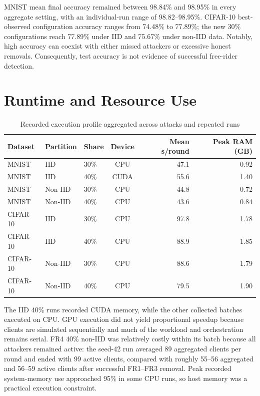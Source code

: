 MNIST mean final accuracy remained between 98.84\% and 98.95\% in every aggregate setting, with an individual-run range of 98.82--98.95\%. CIFAR-10 best-observed configuration accuracy ranges from 74.48\% to 77.89\%; the new 30\% configurations reach 77.89\% under IID and 75.67\% under non-IID data. Notably, high accuracy can coexist with either missed attackers or excessive honest removals. Consequently, test accuracy is not evidence of successful free-rider detection.

\section{Runtime and Resource Use}

\begin{table}[htbp]
\centering
\caption{Recorded execution profile aggregated across attacks and repeated runs}
\label{tab:resources}
\begin{tabular}{lllcrr}
\toprule
Dataset & Partition & Share & Device & Mean s/round & Peak RAM (GB) \\
\midrule
MNIST & IID & 30\% & CPU & 47.1 & 0.92 \\
MNIST & IID & 40\% & CUDA & 55.6 & 1.40 \\
MNIST & Non-IID & 30\% & CPU & 44.8 & 0.72 \\
MNIST & Non-IID & 40\% & CPU & 43.6 & 0.84 \\
CIFAR-10 & IID & 30\% & CPU & 97.8 & 1.78 \\
CIFAR-10 & IID & 40\% & CPU & 88.9 & 1.85 \\
CIFAR-10 & Non-IID & 30\% & CPU & 88.6 & 1.79 \\
CIFAR-10 & Non-IID & 40\% & CPU & 79.5 & 1.90 \\
\bottomrule
\end{tabular}
\end{table}

The IID 40\% runs recorded CUDA memory, while the other collected batches executed on CPU. GPU execution did not yield proportional speedup because clients are simulated sequentially and much of the workload and orchestration remains serial. FR4 40\% non-IID was relatively costly within its batch because all attackers remained active: the seed-42 run averaged 89 aggregated clients per round and ended with 99 active clients, compared with roughly 55--56 aggregated and 56--59 active clients after successful FR1--FR3 removal. Peak recorded system-memory use approached 95\% in some CPU runs, so host memory was a practical execution constraint.

